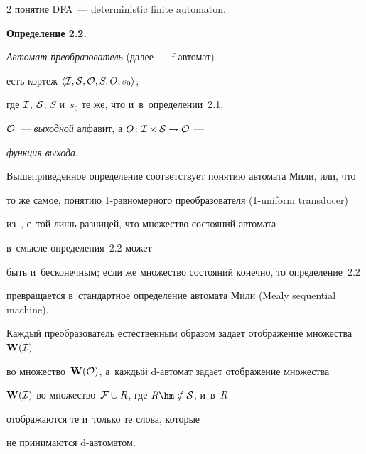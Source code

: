 \begin{multicols}{2}
понятие DFA~--- deterministic finite automaton.








\smallskip





\noindent


\textbf{Определение 2.2.}\


\textit{Автомат-преобразователь} (далее~--- f-ав\-то\-мат)  


есть кортеж $\langle\mathcal I,\mathcal S,\mathcal O,S,O,s_0\rangle$,


где $\mathcal I$, $\mathcal S$, $S$ и~$s_0$  те же, что и~в~определении~2.1,


$\mathcal O$~---   \textit{выходной} алфавит, а $O\colon \mathcal I\times\mathcal S\to\mathcal O$ ---


\textit{функция выхода}.








\smallskip





Вышеприведенное определение соответствует  понятию автомата Мили, или, что


то же самое, понятию 1-равномерного преобразователя (1-uniform transducer)


 из~\cite{Allouche-Shall}, с~той лишь разницей, что множество состояний автомата


 в~смысле определения~2.2 может


быть и~бесконечным; если же множество состояний конечно, то определение~2.2


превращается в~стандартное определение автомата Мили (Mealy sequential machine).





Каждый преобразователь естественным образом задает отображение множества~$\mathbf W(\mathcal I)$


во множество~$\mathbf W(\mathcal O)$, а~каж\-дый d-ав\-то\-мат задает отображение множества


$\mathbf W(\mathcal I)$ во множество~$\mathcal F \cup {R}$, где $R\hm\notin \Cal S$, и~в~$R$


отображаются те и~только те слова,  которые


не принимаются d-ав\-то\-матом.






\end{multicols}

